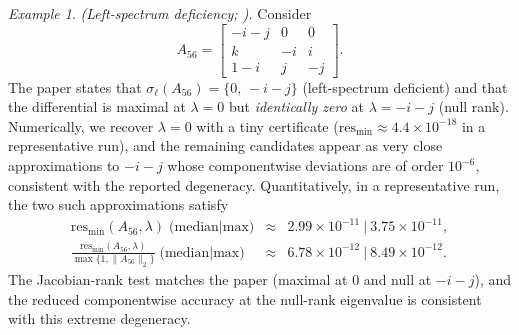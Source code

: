 \documentclass[preprint,12pt]{elsarticle}  %
\theoremstyle{definition}
\theoremstyle{definition}
\theoremstyle{definition}
\theoremstyle{definition}
\theoremstyle{definition}
\theoremstyle{remark}
\theoremstyle{remark}
\newtheorem{Ex}{Example}
\theoremstyle{remark}
\DeclareRobustCommand{\i}{\ensuremath{\mathbf{i}}}
\DeclareRobustCommand{\j}{\ensuremath{\mathbf{j}}}
\DeclareRobustCommand{\k}{\ensuremath{\mathbf{k}}}
\def\i{i}\def\j{j}\def\k{k}%
\begin{document}
\begin{Ex}\label{ex:MVPS_56}
\emph{(Left-spectrum deficiency; \cite[Ex.~56]{MaciasVirgosPereiraSaez2014}).}
Consider
\[
A_{56}=
\begin{bmatrix}
-\i-\j & 0 & 0\\
\k & -\i & \i\\
1-\i & \j & -\j
\end{bmatrix}.
\]
The paper states that $\sigma_\ell(A_{56})=\{0,\,-\i-\j\}$ (left-spectrum deficient) and that the differential is maximal at
$\lambda=0$ but \emph{identically zero} at $\lambda=-\i-\j$ (null rank).
Numerically, we recover $\lambda=0$ with a tiny certificate ($\mathrm{res}_{\min}\approx 4.4\times10^{-18}$ in a representative run),
and the remaining candidates appear as very close approximations to $-\i-\j$ whose componentwise deviations are of order $10^{-6}$,
consistent with the reported degeneracy.
Quantitatively, in a representative run, the two such approximations satisfy
\[
\begin{array}{rcl}
\mathrm{res}_{\min}(A_{56},\lambda)\;
\text{(median|max)}
&\approx& 2.99\times10^{-11}\ \big|\ 3.75\times10^{-11},
\\[2mm]
\frac{\mathrm{res}_{\min}(A_{56},\lambda)}{\max\{1,\|A_{56}\|_2\}}\;
\text{(median|max)}
&\approx& 6.78\times10^{-12}\ \big|\ 8.49\times10^{-12}.
\end{array}
\]
The Jacobian-rank test matches the paper (maximal at $0$ and null at $-\i-\j$), and the reduced componentwise accuracy at
the null-rank eigenvalue is consistent with this extreme degeneracy.
\end{Ex}

\end{document}
